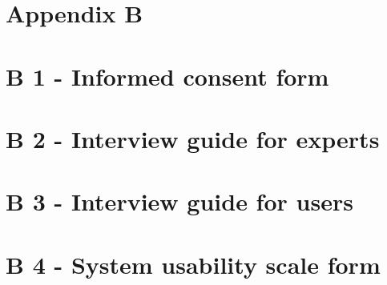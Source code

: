 \section{Appendix B}
\section{B 1 - Informed consent form}


\section{B 2 - Interview guide for experts}


\section{B 3 - Interview guide for users}

\section{B 4 - System usability scale form}
